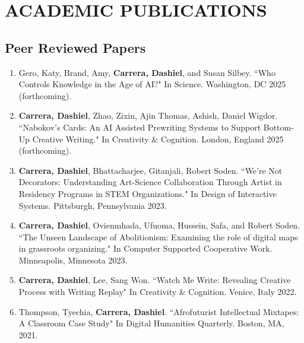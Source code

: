 \section{ACADEMIC PUBLICATIONS}

\subsection{Peer Reviewed Papers}
 \begin{enumerate}
  
  
    \item Gero, Katy, Brand, Amy, \textbf{Carrera, Dashiel}, and Susan Silbey. ``Who Controls Knowledge in the Age of AI?" In Science. Washington, DC 2025 (forthcoming). \\
   
  \item \textbf{Carrera, Dashiel}, Zhao, Zixin, Ajin Thomas, Ashish, Daniel Wigdor. ``Nabokov's Cards: An AI Assisted Prewriting Systems to Support Bottom-Up Creative Writing." In Creativity \& Cognition. London, England 2025 (forthcoming). \\
  \item \textbf{Carrera, Dashiel}, Bhattacharjee, Gitanjali, Robert Soden. ``We're Not Decorators: Understanding Art-Science Collaboration Through Artist in Residency Programs in STEM Organizations." In Design of Interactive Systems. Pittsburgh, Pennsylvania 2023. \\
  \item \textbf{Carrera, Dashiel}, Ovienmhada, Ufuoma, Hussein, Safa, and Robert Soden. ``The Unseen Landscape of Abolitionism: Examining the role of digital maps in
grassroots organizing."  In Computer Supported Cooperative Work. Minneapolis, Minnesota 2023.\\
  \item \textbf{Carrera, Dashiel}, Lee, Sang Won. ``Watch Me Write: Revealing Creative Process with Writing Replay" In Creativity \& Cognition. Venice, Italy 2022. \\
  \item Thompson, Tyechia, \textbf{Carrera, Dashiel}. ``Afrofuturist Intellectual Mixtapes: A Classroom Case Study" In Digital Humanities Quarterly. Boston, MA, 2021.\
 \end{enumerate}

